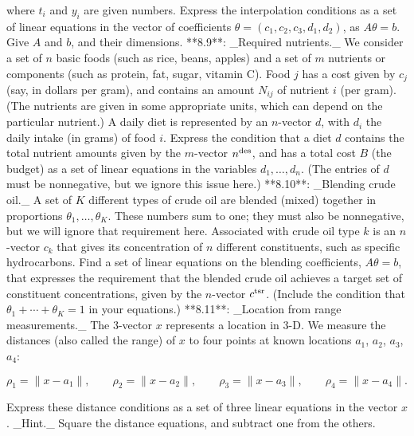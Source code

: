 where \(t_{i}\) and \(y_{i}\) are given numbers. Express the interpolation conditions as a set of linear equations in the vector of coefficients \(\theta=(c_{1},c_{2},c_{3},d_{1},d_{2})\), as \(A\theta=b\). Give \(A\) and \(b\), and their dimensions.
**8.9**: _Required nutrients._ We consider a set of \(n\) basic foods (such as rice, beans, apples) and a set of \(m\) nutrients or components (such as protein, fat, sugar, vitamin C). Food \(j\) has a cost given by \(c_{j}\) (say, in dollars per gram), and contains an amount \(N_{ij}\) of nutrient \(i\) (per gram). (The nutrients are given in some appropriate units, which can depend on the particular nutrient.) A daily diet is represented by an \(n\)-vector \(d\), with \(d_{i}\) the daily intake (in grams) of food \(i\). Express the condition that a diet \(d\) contains the total nutrient amounts given by the \(m\)-vector \(n^{\rm des}\), and has a total cost \(B\) (the budget) as a set of linear equations in the variables \(d_{1},\ldots,d_{n}\). (The entries of \(d\) must be nonnegative, but we ignore this issue here.)
**8.10**: _Blending crude oil._ A set of \(K\) different types of crude oil are blended (mixed) together in proportions \(\theta_{1},\ldots,\theta_{K}\). These numbers sum to one; they must also be nonnegative, but we will ignore that requirement here. Associated with crude oil type \(k\) is an \(n\)-vector \(c_{k}\) that gives its concentration of \(n\) different constituents, such as specific hydrocarbons. Find a set of linear equations on the blending coefficients, \(A\theta=b\), that expresses the requirement that the blended crude oil achieves a target set of constituent concentrations, given by the \(n\)-vector \(c^{\rm tsr}\). (Include the condition that \(\theta_{1}+\cdots+\theta_{K}=1\) in your equations.)
**8.11**: _Location from range measurements._ The 3-vector \(x\) represents a location in 3-D. We measure the distances (also called the range) of \(x\) to four points at known locations \(a_{1}\), \(a_{2}\), \(a_{3}\), \(a_{4}\):

\[\rho_{1}=\|x-a_{1}\|,\qquad\rho_{2}=\|x-a_{2}\|,\qquad\rho_{3}=\|x-a_{3}\|, \qquad\rho_{4}=\|x-a_{4}\|.\]

Express these distance conditions as a set of three linear equations in the vector \(x\). _Hint._ Square the distance equations, and subtract one from the others.

